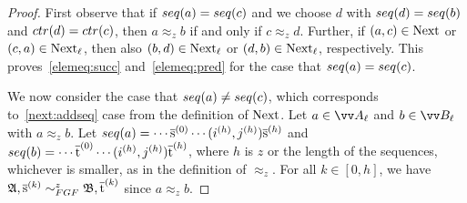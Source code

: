 \begin{proof}
  First observe that if $\seq{a} = \seq{c}$ and we choose $d$ with $\seq{d} = \seq{b}$ and $\ctr{d} = \ctr{c}$, then $a \approx_{z} b$ if and only if $c \approx_{z} d$.
  Further, if $(a,c) \in \mathrm{Next}$ or $(c,a) \in \mathrm{Next}_{\ell}$, then also $(b,d) \in \mathrm{Next}_{\ell}$ or $(d,b) \in \mathrm{Next}_{\ell}$, respectively.
  This proves~\ref{elemeq:succ} and~\ref{elemeq:pred} for the case that $\seq{a} = \seq{c}$.

  We now consider the case that $\seq{a} \neq \seq{c}$, which corresponds to~\ref{next:addseq} case from the definition of $\mathrm{Next}$.
  Let $a \in \unraveldom{A}_{\ell}$ and $b \in \unraveldom{B}_{\ell}$ with $a \approx_{z} b$.
  Let
  $\seq{a} = \cdots \elemtuples^{(0)} \cdots (i^{(h)}, j^{(h)})\elemtuples^{(h)}$ and $\seq{b} = \cdots \elemtuplet^{(0)} \cdots (i^{(h)}, j^{(h)})\elemtuplet^{(h)}$, where $h$ is $z$ or the length of the sequences, whichever is smaller, as in the definition of $\approx_{z}$.
  For all $k \in [0,h]$, we have $\str{A}, \elemtuples^{(k)} \bisimto_{\FGF}^{z} \str{B}, \elemtuplet^{(k)}$ since $a \approx_{z} b$.


\end{proof}

